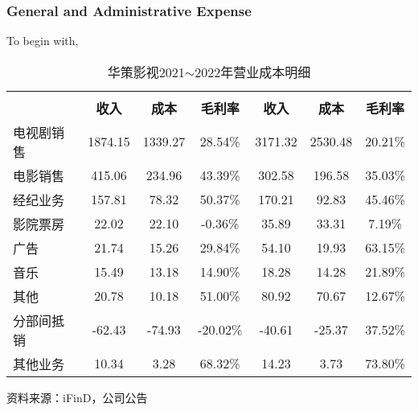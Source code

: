 \documentclass{coursereport}
\begin{document}
\subsubsection{General and Administrative Expense}
To begin with,
\begin{table}[H]
	\centering
	\caption{华策影视2021$\sim$2022年营业成本明细}
	\label{tab:my-table}
	\begin{threeparttable}
		\begin{tabular}{lcccccc}
			\hline
			\rowcolor[HTML]{C0C0C0} 
			\multicolumn{1}{c}{\cellcolor[HTML]{C0C0C0}{\color[HTML]{000000} }} &
			\multicolumn{3}{c}{\cellcolor[HTML]{C0C0C0}{\color[HTML]{000000} \textbf{2022年}}} &
			\multicolumn{3}{c}{\cellcolor[HTML]{C0C0C0}{\color[HTML]{000000} \textbf{2021年}}} \\
			\rowcolor[HTML]{C0C0C0} 
			\multicolumn{1}{c}{\multirow{-2}{*}{\cellcolor[HTML]{C0C0C0}{\color[HTML]{000000} \textbf{产品（百万元）}}}} &
			{\color[HTML]{000000} \textbf{收入}} &
			{\color[HTML]{000000} \textbf{成本}} &
			{\color[HTML]{000000} \textbf{毛利率}} &
			{\color[HTML]{000000} \textbf{收入}} &
			{\color[HTML]{000000} \textbf{成本}} &
			{\color[HTML]{000000} \textbf{毛利率}} \\ \hline
			电视剧销售\qquad\qquad\qquad\qquad\qquad\qquad\qquad\qquad & 1874.15 & 1339.27 & 28.54\%  & 3171.32 & 2530.48 & 20.21\% \\
			电影销售  & 415.06  & 234.96  & 43.39\%  & 302.58  & 196.58  & 35.03\% \\
			经纪业务  & 157.81  & 78.32   & 50.37\%  & 170.21  & 92.83   & 45.46\% \\
			影院票房  & 22.02   & 22.10   & -0.36\%  & 35.89   & 33.31   & 7.19\%  \\
			广告    & 21.74   & 15.26   & 29.84\%  & 54.10   & 19.93   & 63.15\% \\
			音乐    & 15.49   & 13.18   & 14.90\%  & 18.28   & 14.28   & 21.89\% \\
			其他    & 20.78   & 10.18   & 51.00\%  & 80.92   & 70.67   & 12.67\% \\
			分部间抵销 & -62.43  & -74.93  & -20.02\% & -40.61  & -25.37  & 37.52\% \\
			其他业务  & 10.34   & 3.28    & 68.32\%  & 14.23   & 3.73    & 73.80\% \\ \hline
		\end{tabular}
		\begin{tablenotes}
			\item 资料来源：iFinD，公司公告
		\end{tablenotes}
	\end{threeparttable}
\end{table}
\end{document}
